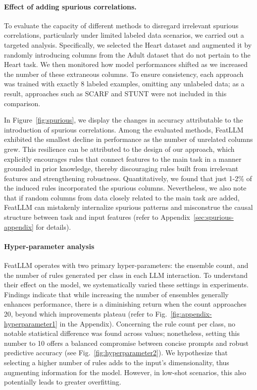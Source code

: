 \vspace*{-0.12in}
\paragraph{Effect of adding spurious correlations.} To evaluate the capacity of different methods to disregard irrelevant spurious correlations, particularly under limited labeled data scenarios, we carried out a targeted analysis. Specifically, we selected the Heart dataset and augmented it by randomly introducing columns from the Adult dataset that do not pertain to the Heart task. We then monitored how model performances shifted as we increased the number of these extraneous columns. To ensure consistency, each approach was trained with exactly 8 labeled examples, omitting any unlabeled data; as a result, approaches such as SCARF and STUNT were not included in this comparison.

In Figure~\ref{fig:spurious}, we display the changes in accuracy attributable to the introduction of spurious correlations. Among the evaluated methods, \textsf{FeatLLM} exhibited the smallest decline in performance as the number of unrelated columns grew. This resilience can be attributed to the design of our approach, which explicitly encourages rules that connect features to the main task in a manner grounded in prior knowledge, thereby discouraging rules built from irrelevant features and strengthening robustness. Quantitatively, we found that just 1-2\% of the induced rules incorporated the spurious columns. Nevertheless, we also note that if random columns from data closely related to the main task are added, \textsf{FeatLLM} can mistakenly internalize spurious patterns and misconstrue the causal structure between task and input features (refer to Appendix~\ref{sec:spurious-appendix} for details).

\vspace*{-0.12in}
\paragraph{Hyper-parameter analysis}
\textsf{FeatLLM} operates with two primary hyper-parameters: the ensemble count, and the number of rules generated per class in each LLM interaction. To understand their effect on the model, we systematically varied these settings in experiments. Findings indicate that while increasing the number of ensembles generally enhances performance, there is a diminishing return when the count approaches 20, beyond which improvements plateau (refer to Fig.~\ref{fig:appendix-hyperparameter1} in the Appendix). Concerning the rule count per class, no notable statistical difference was found across values; nonetheless, setting this number to 10 offers a balanced compromise between concise prompts and robust predictive accuracy (see Fig.~\ref{fig:hyperparameter2}). We hypothesize that selecting a higher number of rules adds to the input’s dimensionality, thus augmenting information for the model. However, in low-shot scenarios, this also potentially leads to greater overfitting.

